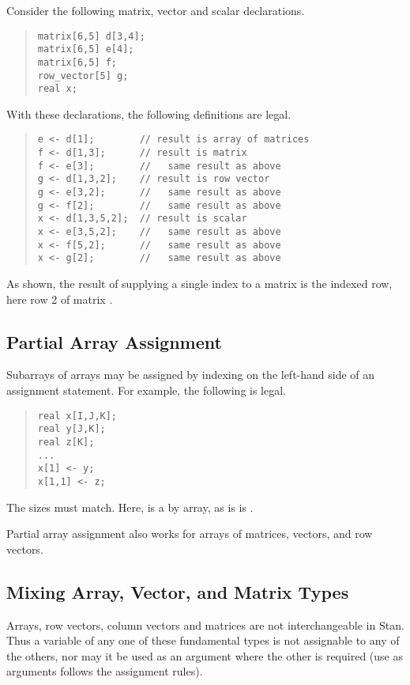 Consider the following matrix, vector and scalar declarations.
%
\begin{quote}
\begin{Verbatim}
matrix[6,5] d[3,4];
matrix[6,5] e[4];
matrix[6,5] f;
row_vector[5] g;
real x;
\end{Verbatim}
\end{quote}
%
With these declarations, the following definitions are legal.
%
\begin{quote}
\begin{Verbatim}
e <- d[1];        // result is array of matrices
f <- d[1,3];      // result is matrix
f <- e[3];        //   same result as above
g <- d[1,3,2];    // result is row vector
g <- e[3,2];      //   same result as above
g <- f[2];        //   same result as above
x <- d[1,3,5,2];  // result is scalar
x <- e[3,5,2];    //   same result as above
x <- f[5,2];      //   same result as above
x <- g[2];        //   same result as above
\end{Verbatim}
\end{quote}
%
As shown, the result  of supplying a single index to a
matrix is the indexed row, here row 2 of matrix .


\subsection{Partial Array Assignment}

Subarrays of arrays may be assigned by indexing on the left-hand side
of an assignment statement.  For example, the following is legal.
%
\begin{quote}
\begin{Verbatim}
real x[I,J,K];
real y[J,K];
real z[K];
...
x[1] <- y;
x[1,1] <- z;
\end{Verbatim}
\end{quote}
%
The sizes must match.  Here,  is a  by 
array, as is is .  

Partial array assignment also works for arrays of matrices, vectors,
and row vectors.  








\subsection{Mixing Array, Vector, and Matrix Types}

Arrays, row vectors, column vectors and matrices are not
interchangeable in Stan.  Thus a variable of any one of these
fundamental types is not assignable to any of the others, nor may it
be used as an argument where the other is required (use as arguments
follows the assignment rules).



